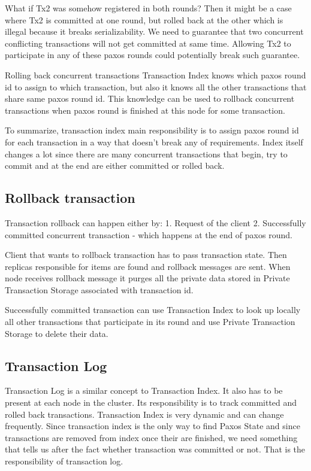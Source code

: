 What if Tx2 was somehow registered in both rounds? Then it might be a case where Tx2 is committed at one round, but rolled back at the other which is illegal because it breaks serializability. We need to guarantee that two concurrent conflicting transactions will not get committed at same time. Allowing Tx2 to participate in any of these paxos rounds could potentially break such guarantee.


Rolling back concurrent transactions
Transaction Index knows which paxos round id to assign to which transaction, but also it knows all the other transactions that share same paxos round id. This knowledge can be used to rollback concurrent transactions when paxos round is finished at this node for some transaction.


To summarize, transaction index main responsibility is to assign paxos round id for each transaction in a way that doesn’t break any of requirements. Index itself changes a lot since there are many concurrent transactions that begin, try to commit and at the end are either committed or rolled back. 




\subsection{Rollback transaction}
Transaction rollback can happen either by:
1. Request of the client
2. Successfully committed concurrent transaction - which happens at the end of paxos round.


Client that wants to rollback transaction has to pass transaction state. Then replicas responsible for items are found and rollback messages are sent. When node receives rollback message it purges all the private data stored in Private Transaction Storage associated with transaction id.


Successfully committed transaction can use Transaction Index to look up locally all other transactions that participate in its round and use Private Transaction Storage to delete their data.


\subsection{Transaction Log}
Transaction Log is a similar concept to Transaction Index. It also has to be present at each node in the cluster. Its responsibility is to track committed and rolled back transactions. Transaction Index is very dynamic and can change frequently. Since transaction index is the only way to find Paxos State and since transactions are removed from index once their are finished, we need something that tells us after the fact whether transaction was committed or not. That is the responsibility of transaction log.


